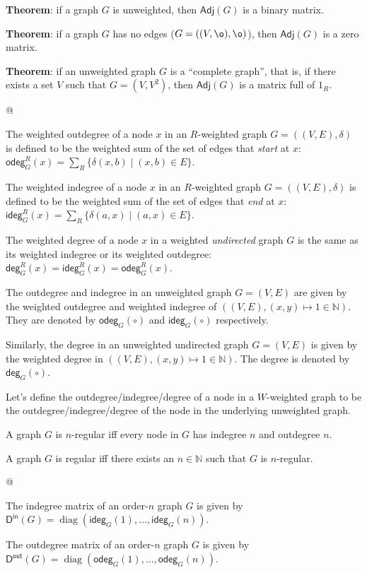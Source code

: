 \documentclass[]{article}
\newcommand{\textbs}[1]{{\sffamily\fontseries{sbc}\selectfont #1}}
\newcommand{\mbb}[1]{\ensuremath{\mathbb{#1}}}     %
\newcommand{\msf}[1]{\ensuremath{\mathsf{#1}}}     %
\renewcommand{\empty}[0]{\ensuremath{\o}}
\newcommand{\degree}[3]{\ensuremath{\msf{deg}_{#2}^{#1}(#3)}}
\newcommand{\indegree}[3]{\ensuremath{\msf{ideg}_{#2}^{#1}(#3)}}
\newcommand{\outdegree}[3]{\ensuremath{\msf{odeg}_{#2}^{#1}(#3)}}
\DeclareMathOperator{\diag}{diag}
\newcommand{\define}[1]{\textbs{#1}}
\begin{document}
\begin{refsection}
\begin{easylist}[itemize]
{  \textbf{Theorem}:
  if a graph $G$ is unweighted, then $\msf{Adj}(G)$ is a binary matrix.

  \textbf{Theorem}:
  if a graph $G$ has no edges ($G = ((V, \empty), \empty)$),
  then $\msf{Adj}(G)$ is a zero matrix.

  \textbf{Theorem}:
  if an unweighted graph $G$ is a ``complete graph'', that is, if there
  exists a set $V$ such that $G = (V, V^2)$, then $\msf{Adj}(G)$ is a matrix
  full of $1_R$.
}
@ {%
  The \define{weighted outdegree} of a node $x$ in an $R$-weighted graph
  $G = ((V, E), \delta)$ is defined to be the weighted sum of the set of edges
  that \textit{start} at $x$:
  $\outdegree{R}{G}{x} = \sum_R \{\delta(x, b) \mid (x, b) \in E\}$.

  The \define{weighted indegree} of a node $x$ in an $R$-weighted graph
  $G = ((V, E), \delta)$ is defined to be the weighted sum of the set of edges
  that \textit{end} at $x$:
  $\indegree{R}{G}{x} = \sum_R \{\delta(a, x) \mid (a, x) \in E\}$.

  The \define{weighted degree} of a node $x$ in a weighted \textit{undirected}
  graph $G$ is the same as its weighted indegree or its weighted outdegree:
  $\degree{R}{G}{x} = \indegree{R}{G}{x} = \outdegree{R}{G}{x}$.

  The \define{outdegree} and \define{indegree} in an unweighted graph
  $G = (V, E)$ are given by the weighted outdegree and weighted indegree of
  $((V, E), (x, y) \mapsto 1 \in \mbb{N})$.
  They are denoted by $\outdegree{}{G}{\circ}$ and $\indegree{}{G}{\circ}$
  respectively.

  Similarly, the \define{degree} in an unweighted undirected graph $G = (V, E)$
  is given by the weighted degree in $((V, E), (x, y) \mapsto 1 \in \mbb{N})$.
  The degree is denoted by $\degree{}{G}{\circ}$.

  Let's define the outdegree/indegree/degree of a node in a $W$-weighted graph
  to be the outdegree/indegree/degree of the node in the underlying unweighted
  graph.

  A graph $G$ is \define{$n$-regular} iff every node in $G$ has indegree $n$
  and outdegree $n$.

  A graph $G$ is \define{regular} iff there exists an $n \in \mbb{N}$ such
  that $G$ is $n$-regular.
}
@ {%
  The \define{indegree matrix} of an order-$n$ graph $G$ is given by
  $\msf{D}^\msf{in}(G) = \diag(\indegree{}{G}{1}, \dotsc, \indegree{}{G}{n})$.

  The \define{outdegree matrix} of an order-$n$ graph $G$ is given by
  $\msf{D}^\msf{out}(G) = \diag(\outdegree{}{G}{1}, \dotsc, \outdegree{}{G}{n})$.

}
\end{easylist}
\end{refsection}
\end{document}
